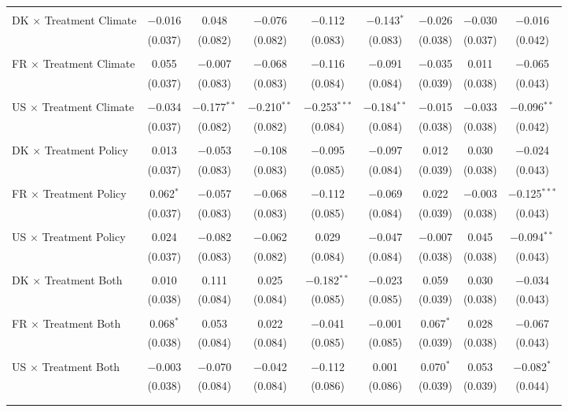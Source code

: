 \begin{tabular}{@{\extracolsep{5pt}}lcccccccc}
  & & & & & & & & \\ 
 DK $\times$ Treatment Climate & $-$0.016 & 0.048 & $-$0.076 & $-$0.112 & $-$0.143$^{*}$ & $-$0.026 & $-$0.030 & $-$0.016 \\ 
  & (0.037) & (0.082) & (0.082) & (0.083) & (0.083) & (0.038) & (0.037) & (0.042) \\ 
  & & & & & & & & \\ 
 FR $\times$ Treatment Climate & 0.055 & $-$0.007 & $-$0.068 & $-$0.116 & $-$0.091 & $-$0.035 & 0.011 & $-$0.065 \\ 
  & (0.037) & (0.083) & (0.083) & (0.084) & (0.084) & (0.039) & (0.038) & (0.043) \\ 
  & & & & & & & & \\ 
 US $\times$ Treatment Climate & $-$0.034 & $-$0.177$^{**}$ & $-$0.210$^{**}$ & $-$0.253$^{***}$ & $-$0.184$^{**}$ & $-$0.015 & $-$0.033 & $-$0.096$^{**}$ \\ 
  & (0.037) & (0.082) & (0.082) & (0.084) & (0.084) & (0.038) & (0.038) & (0.042) \\ 
  & & & & & & & & \\ 
 DK $\times$ Treatment Policy & 0.013 & $-$0.053 & $-$0.108 & $-$0.095 & $-$0.097 & 0.012 & 0.030 & $-$0.024 \\ 
  & (0.037) & (0.083) & (0.083) & (0.085) & (0.084) & (0.039) & (0.038) & (0.043) \\ 
  & & & & & & & & \\ 
 FR $\times$ Treatment Policy & 0.062$^{*}$ & $-$0.057 & $-$0.068 & $-$0.112 & $-$0.069 & 0.022 & $-$0.003 & $-$0.125$^{***}$ \\ 
  & (0.037) & (0.083) & (0.083) & (0.085) & (0.084) & (0.039) & (0.038) & (0.043) \\ 
  & & & & & & & & \\ 
 US $\times$ Treatment Policy & 0.024 & $-$0.082 & $-$0.062 & 0.029 & $-$0.047 & $-$0.007 & 0.045 & $-$0.094$^{**}$ \\ 
  & (0.037) & (0.083) & (0.082) & (0.084) & (0.084) & (0.038) & (0.038) & (0.043) \\ 
  & & & & & & & & \\ 
 DK $\times$ Treatment Both & 0.010 & 0.111 & 0.025 & $-$0.182$^{**}$ & $-$0.023 & 0.059 & 0.030 & $-$0.034 \\ 
  & (0.038) & (0.084) & (0.084) & (0.085) & (0.085) & (0.039) & (0.038) & (0.043) \\ 
  & & & & & & & & \\ 
 FR $\times$ Treatment Both & 0.068$^{*}$ & 0.053 & 0.022 & $-$0.041 & $-$0.001 & 0.067$^{*}$ & 0.028 & $-$0.067 \\ 
  & (0.038) & (0.084) & (0.084) & (0.085) & (0.085) & (0.039) & (0.038) & (0.043) \\ 
  & & & & & & & & \\ 
 US $\times$ Treatment Both & $-$0.003 & $-$0.070 & $-$0.042 & $-$0.112 & 0.001 & 0.070$^{*}$ & 0.053 & $-$0.082$^{*}$ \\ 
  & (0.038) & (0.084) & (0.084) & (0.086) & (0.086) & (0.039) & (0.039) & (0.044) \\ 
  & & & & & & & & \\ 
\hline \\[-1.8ex] 


\end{tabular}

